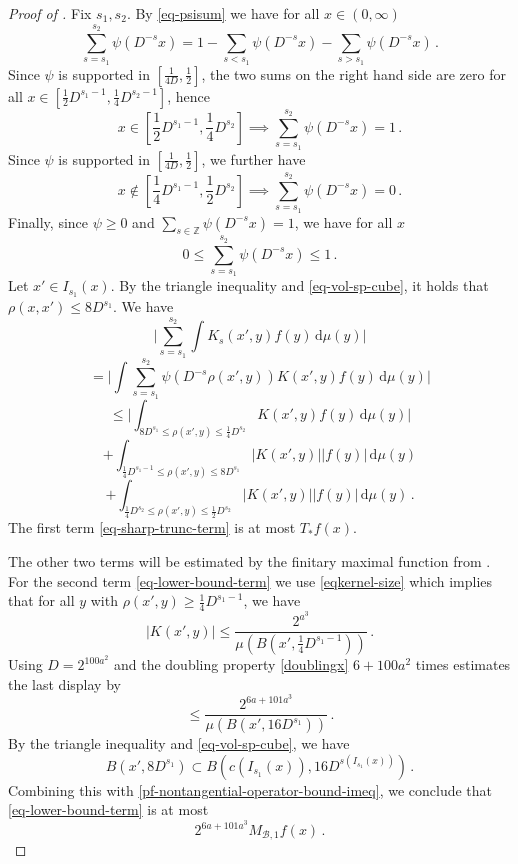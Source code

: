 \begin{proof}[Proof of ]
    Fix $s_1, s_2$. By \eqref{eq-psisum} we have for all $x \in (0, \infty)$
    $$
        \sum_{s = s_1}^{s_2} \psi(D^{-s}x) = 1 - \sum_{s < s_1} \psi(D^{-s}x) - \sum_{s > s_1} \psi(D^{-s}x)\,.
    $$
    Since $\psi$ is supported in $[\frac{1}{4D}, \frac{1}{2}]$, the two sums on the right hand side are zero for all $x \in [\frac{1}{2}D^{s_1-1}, \frac{1}{4} D^{s_2 - 1}]$, hence
    $$
        x \in [\frac{1}{2}D^{s_1-1}, \frac{1}{4} D^{s_2}] \implies \sum_{s = s_1}^{s_2} \psi(D^{-s}x) = 1\,.
    $$
    Since $\psi$ is supported in $[\frac{1}{4D}, \frac{1}{2}]$, we further have
    $$
        x \notin [\frac{1}{4}D^{s_1 - 1}, \frac{1}{2}D^{s_2}] \implies \sum_{s = s_1}^{s_2} \psi(D^{-s}x) = 0\,.
    $$
    Finally, since $\psi \ge 0$ and $\sum_{s \in \mathbb{Z}} \psi(D^{-s}x) = 1$, we have for all $x$
    $$
        0 \le \sum_{s = s_1}^{s_2} \psi(D^{-s}x) \le 1\,.
    $$
    Let $x' \in I_{s_1}(x)$. By the triangle inequality and \eqref{eq-vol-sp-cube}, it holds that $\rho(x,x') \le 8D^{s_1}$. We have
    $$
        \Bigg|\sum_{s = s_1}^{s_2} \int K_s(x',y) f(y) \, \mathrm{d}\mu(y)\Bigg|
    $$
    $$
        = \Bigg|\int \sum_{s = s_1}^{s_2} \psi(D^{-s}\rho(x',y)) K(x',y) f(y) \, \mathrm{d}\mu(y)\Bigg|
    $$
    \begin{equation}
        \label{eq-sharp-trunc-term}
        \le \Bigg| \int_{8D^{s_1} \le \rho(x',y) \le \frac{1}{4}D^{s_2}} K(x',y) f(y) \, \mathrm{d}\mu(y) \Bigg|
    \end{equation}
    \begin{equation}
        \label{eq-lower-bound-term}
        + \int_{\frac{1}{4}D^{s_1-1} \le \rho(x',y) \le 8D^{s_1}} |K(x', y)| |f(y)| \, \mathrm{d}\mu(y)
    \end{equation}
    \begin{equation}
        \label{eq-upper-bound-term}
        + \int_{\frac{1}{4}D^{s_2} \le \rho(x',y) \le \frac{1}{2}D^{s_2}} |K(x', y)| |f(y)| \, \mathrm{d}\mu(y)\,.
    \end{equation}
    The first term \eqref{eq-sharp-trunc-term} is at most $T_* f(x)$.

    The other two terms will be estimated by the finitary maximal function from .
    For the second term \eqref{eq-lower-bound-term} we use \eqref{eqkernel-size} which implies that for all $y$ with $\rho(x', y) \ge \frac{1}{4}D^{s_1 - 1}$, we have
    $$
        |K(x', y)| \le \frac{2^{a^3}}{\mu(B(x', \frac{1}{4}D^{s_1 - 1}))}\,.
    $$
    Using $D=2^{100a^2}$
    and the doubling property \eqref{doublingx} $6 +100a^2$ times estimates
    the last display by
    \begin{equation}
    \label{pf-nontangential-operator-bound-imeq}
        \le \frac{2^{6a+101a^3}}{\mu(B(x', 16D^{s_1}))}\, .
    \end{equation}
    By the triangle inequality and \eqref{eq-vol-sp-cube}, we have
    $$
        B(x', 8D^{s_1}) \subset B(c(I_{s_1}(x)), 16D^{s(I_{s_1}(x))})\,.
    $$
    Combining this with \eqref{pf-nontangential-operator-bound-imeq}, we conclude that \eqref{eq-lower-bound-term} is at most
    $$
        2^{6a + 101a^3} M_{\mathcal{B},1} f(x)\,.
    $$


\end{proof}
